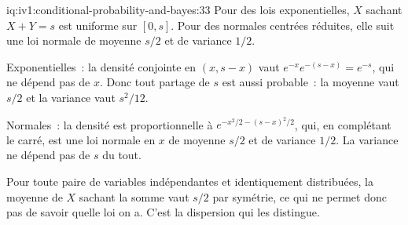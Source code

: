 \begin{solution}{iq:iv1:conditional-probability-and-bayes:33}
Pour des lois exponentielles, $X$ sachant $X + Y = s$ est uniforme sur $[0, s]$. Pour des normales centrées réduites, elle suit une loi normale de moyenne $s/2$ et de variance $1/2$.

Exponentielles~: la densité conjointe en $(x, s - x)$ vaut $e^{-x} e^{-(s - x)} = e^{-s}$, qui ne dépend pas de $x$. Donc tout partage de $s$ est aussi probable~: la moyenne vaut $s/2$ et la variance vaut $s^2/12$.

Normales~: la densité est proportionnelle à $e^{-x^2/2 - (s-x)^2/2}$, qui, en complétant le carré, est une loi normale en $x$ de moyenne $s/2$ et de variance $1/2$. La variance ne dépend pas de $s$ du tout.

Pour toute paire de variables indépendantes et identiquement distribuées, la moyenne de $X$ sachant la somme vaut $s/2$ par symétrie, ce qui ne permet donc pas de savoir quelle loi on a. C'est la dispersion qui les distingue.

\end{solution}

